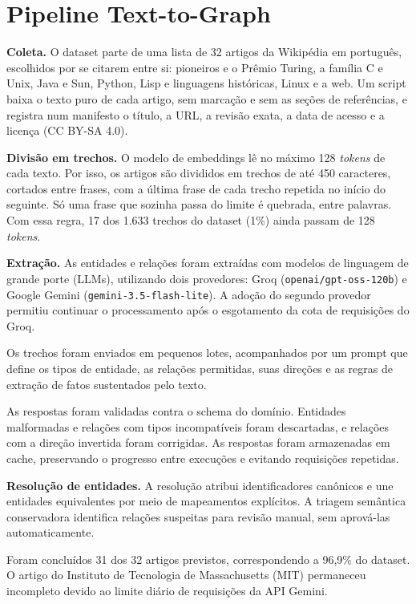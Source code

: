 \documentclass[12pt]{article}
\begin{document}
\section{Pipeline Text-to-Graph}
\label{sec:pipeline}

\textbf{Coleta.} O dataset parte de uma lista de 32 artigos da Wikipédia em português,
escolhidos por se citarem entre si: pioneiros e o Prêmio Turing, a família C e Unix,
Java e Sun, Python, Lisp e linguagens históricas, Linux e a web. Um script baixa o texto
puro de cada artigo, sem marcação e sem as seções de referências, e registra num
manifesto o título, a URL, a revisão exata, a data de acesso e a licença (CC BY-SA 4.0).

\textbf{Divisão em trechos.} O modelo de embeddings lê no máximo 128 \textit{tokens} de
cada texto. Por isso, os artigos são divididos em trechos de até 450 caracteres, cortados
entre frases, com a última frase de cada trecho repetida no início do seguinte. Só uma
frase que sozinha passa do limite é quebrada, entre palavras. Com essa regra, 17 dos
1.633 trechos do dataset (1\%) ainda passam de 128 \textit{tokens}.

\textbf{Extração.} As entidades e relações foram extraídas
com modelos de linguagem de grande porte (LLMs), utilizando
dois provedores: Groq (\texttt{openai/gpt-oss-120b}) e
Google Gemini (\texttt{gemini-3.5-flash-lite}). A adoção do segundo provedor
permitiu continuar o processamento após o esgotamento da
cota de requisições do Groq.

Os trechos foram enviados em pequenos lotes, acompanhados
por um prompt que define os tipos de entidade, as relações
permitidas, suas direções e as regras de extração de fatos
sustentados pelo texto.

As respostas foram validadas contra o schema do domínio.
Entidades malformadas e relações com tipos incompatíveis
foram descartadas, e relações com a direção invertida foram
corrigidas. As respostas foram armazenadas em cache,
preservando o progresso entre execuções e evitando
requisições repetidas.

\textbf{Resolução de entidades.} A resolução atribui
identificadores canônicos e une entidades equivalentes
por meio de mapeamentos explícitos. A triagem semântica
conservadora identifica relações suspeitas para revisão
manual, sem aprová-las automaticamente.

Foram concluídos 31 dos 32 artigos previstos, correspondendo
a 96,9\% do dataset. O artigo do Instituto de Tecnologia
de Massachusetts (MIT) permaneceu incompleto devido ao
limite diário de requisições da API Gemini.
\end{document}
